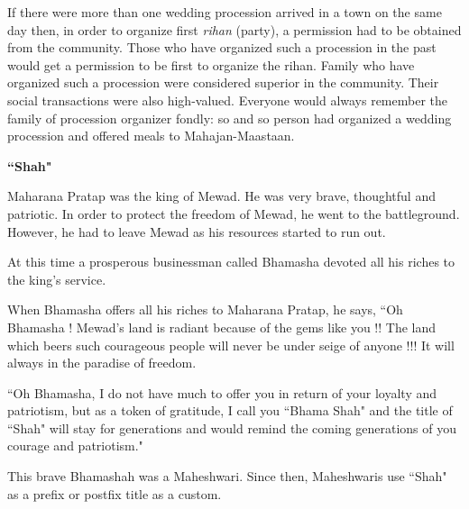 If there were more than one wedding procession arrived in a town on the same
day then, in order to organize first \textit{rihan} (party), a permission had
to be obtained from the community. Those who have organized such a procession
in the past would get a permission to be first to organize the rihan. Family
who have organized such a procession were considered superior in the community.
Their social transactions were also high-valued. Everyone would always remember
the family of procession organizer fondly: so and so person had organized a
wedding procession and offered meals to Mahajan-Maastaan.
\begin{framed}
\begin{center}\textbf{``Shah"}\end{center}

Maharana Pratap was the king of Mewad. He was very brave, thoughtful and
patriotic. In order to protect the freedom of Mewad, he went to the
battleground. However, he had to leave Mewad as his resources started to run
out. 

At this time a prosperous businessman called Bhamasha devoted all his riches to
the king's service.

When Bhamasha offers all his riches to Maharana Pratap, he says, ``Oh Bhamasha !
Mewad's land is radiant because of the gems like you !! The land which beers
such courageous people will never be under seige of anyone !!! It will always
in the paradise of freedom.

``Oh Bhamasha, I do not have much to offer you in return of your loyalty and
patriotism, but as a token of gratitude, I call you ``Bhama Shah" and the title
of ``Shah" will stay for generations and would remind the coming generations of
you courage and patriotism."

This brave Bhamashah was a Maheshwari. Since then, Maheshwaris use ``Shah" as a
prefix or postfix title as a custom.

\end{framed}
